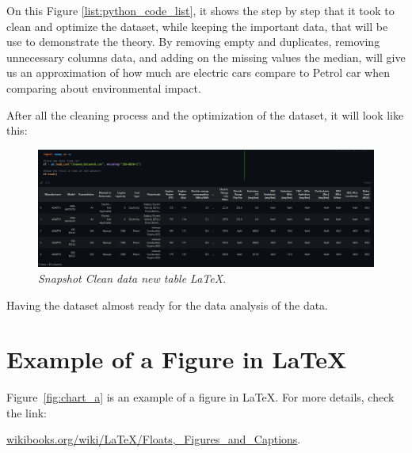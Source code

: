 On this Figure \ref{list:python_code_list}, it shows the step by step that it took to clean and optimize the dataset, while keeping the important data, that will be use to demonstrate the theory. By removing empty and duplicates, removing unnecessary columns data, and adding on the missing values the median, will give us an approximation of how much are electric cars compare to Petrol car when comparing about environmental impact.


After all the cleaning process and the optimization of the dataset, it will look like this:
\begin{figure}[H]
    \centering
    \includegraphics[scale=0.35]{figures/CleanData.png}
    \caption{\textit{Snapshot Clean data new table \LaTeX}.}
    \label{fig:chart_2}
\end{figure}

Having the dataset almost ready for the data analysis of the data.
            

\section{Example of a Figure in \LaTeX}
Figure~\ref{fig:chart_a} is an example of a figure in \LaTeX. For more details, check the link:

\href{https://en.wikibooks.org/wiki/LaTeX/Floats,_Figures_and_Captions}{wikibooks.org/wiki/LaTeX/Floats,\_Figures\_and\_Captions}.

